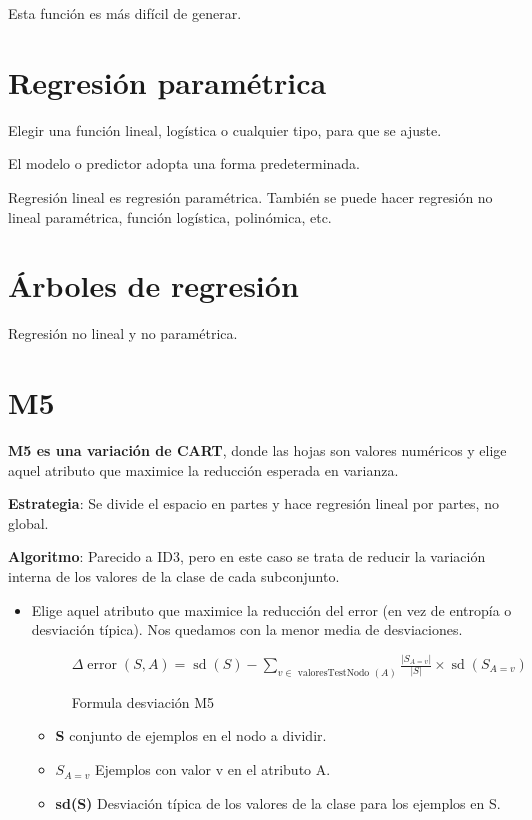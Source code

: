 \documentclass[12pt, twoside, openright]{report} %
\begin{document}
Esta función es más difícil de generar.

\section{Regresión paramétrica}

Elegir una función lineal, logística o cualquier tipo, para que se ajuste.

El modelo o predictor adopta una forma predeterminada.

Regresión lineal es regresión paramétrica. También se puede hacer
regresión no lineal paramétrica, función logística, polinómica, etc.

\section{Árboles de regresión}

Regresión no lineal y no paramétrica.

\section{M5}

\textbf{M5 es una variación de CART}, donde las hojas son valores numéricos y
elige aquel atributo que maximice la reducción esperada en varianza.

\textbf{Estrategia}: Se divide el espacio en partes y hace regresión
lineal por partes, no global.

\textbf{Algoritmo}: Parecido a ID3, pero en este caso se trata de
reducir la variación interna de los valores de la clase de cada
subconjunto.

\begin{itemize}
	\item Elige aquel atributo que maximice la reducción del error (en vez de
	      entropía o desviación típica). Nos quedamos con la menor media de
	      desviaciones.
	      \begin{figure}[H]
		      \(\Delta \operatorname{error}(S, A)=\operatorname{sd}(S)-\sum_{v \in \text { valoresTestNodo }(A)} \frac{\left|S_{A=v}\right|}{|S|} \times \operatorname{sd}\left(S_{A=v}\right)\)
		      \captionsetup{justification=centering}
		      \caption{Formula desviación M5}
	      \end{figure}

	      \begin{itemize}
		      \item \textbf{S} conjunto de ejemplos en el nodo a dividir.
		      \item \textbf{\(S_{A=v}\)} Ejemplos con valor v en el atributo A.
		      \item \textbf{sd(S)} Desviación típica de los valores de la clase para los
		            ejemplos en S.
	      \end{itemize}
\end{itemize}
\end{document}
